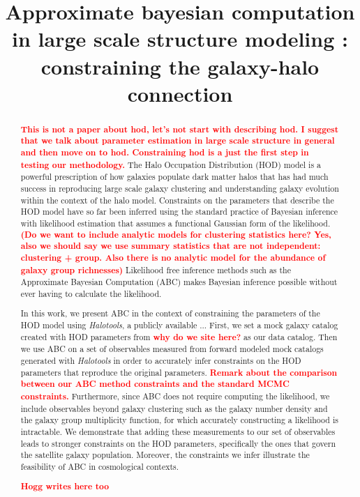 \documentclass[12pt, preprint]{aastex}
\newcommand{\todo}[1]{{\bf \textcolor{red}{ #1}}}
\begin{document}
\title{Approximate bayesian computation in large scale structure modeling : constraining the galaxy-halo connection}
\begin{abstract}
\todo{This is not a paper about hod, let's not start with describing hod. I suggest that we talk about parameter estimation in large scale structure in general and then move on to hod. Constraining hod is a just the first step in testing our methodology.} The Halo Occupation Distribution (HOD) model is a powerful prescription of how galaxies
populate dark matter halos that has had much success in reproducing large scale galaxy
clustering and understanding galaxy evolution within the context of the halo model.
Constraints on the parameters that describe the HOD model have so far been inferred using 
the standard practice of Bayesian inference with likelihood estimation that assumes a
functional Gaussian form of the likelihood.\todo{(Do we want to include analytic models for clustering statistics here? Yes, also we should say we use summary statistics that are not independent: clustering + group. Also there is no analytic model for the abundance of galaxy group richnesses)}  %
Likelihood free inference methods such as the
Approximate Bayesian Computation (ABC) makes Bayesian inference possible without ever 
having to calculate the likelihood. 

In this work, we present ABC in the context of constraining the parameters of the HOD model
using {\it Halotools}, a publicly available ... First, we set a mock galaxy catalog created
with HOD parameters from \cite{Zheng:2007aa} \todo{why do we site here?} as our data catalog. Then we use ABC on a set 
of observables measured from forward modeled mock catalogs generated with {\it Halotools} 
in order to accurately infer constraints on the HOD parameters that 
reproduce the original parameters. \todo{Remark about the comparison between our ABC 
method constraints and the standard MCMC constraints.} Furthermore, since ABC does 
not require computing the likelihood, we include observables beyond galaxy clustering 
such as the galaxy number density and the galaxy group multiplicity function, for which
accurately constructing a likelihood is intractable. 
We demonstrate that adding these measurements to our set of observables leads to stronger
constraints on the HOD parameters, specifically the ones that govern the satellite galaxy
population. Moreover, the constraints we infer illustrate the feasibility of ABC in 
cosmological contexts.

\todo{Hogg writes here too}

\end{abstract}
\end{document}
